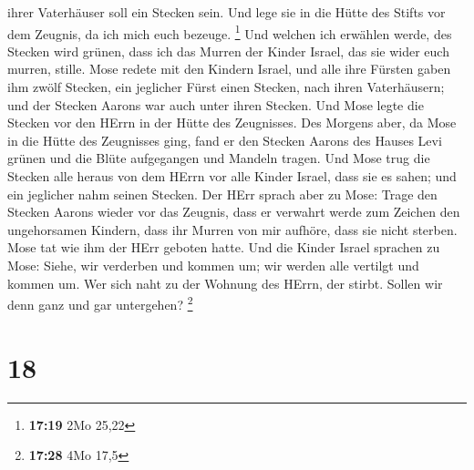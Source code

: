 ihrer Vaterhäuser soll ein Stecken sein.  Und lege sie in
die Hütte des Stifts vor dem Zeugnis, da ich mich euch bezeuge.
\footnote{\textbf{17:19} 2Mo 25,22}  Und welchen ich
erwählen werde, des Stecken wird grünen, dass ich das Murren der Kinder
Israel, das sie wider euch murren, stille.  Mose redete
mit den Kindern Israel, und alle ihre Fürsten gaben ihm zwölf Stecken,
ein jeglicher Fürst einen Stecken, nach ihren Vaterhäusern; und der
Stecken Aarons war auch unter ihren Stecken.  Und Mose
legte die Stecken vor den HErrn in der Hütte des Zeugnisses.
 Des Morgens aber, da Mose in die Hütte des Zeugnisses
ging, fand er den Stecken Aarons des Hauses Levi grünen und die Blüte
aufgegangen und Mandeln tragen.  Und Mose trug die
Stecken alle heraus von dem HErrn vor alle Kinder Israel, dass sie es
sahen; und ein jeglicher nahm seinen Stecken.  Der HErr
sprach aber zu Mose: Trage den Stecken Aarons wieder vor das Zeugnis,
dass er verwahrt werde zum Zeichen den ungehorsamen Kindern, dass ihr
Murren von mir aufhöre, dass sie nicht sterben.  Mose tat
wie ihm der HErr geboten hatte.  Und die Kinder Israel
sprachen zu Mose: Siehe, wir verderben und kommen um; wir werden alle
vertilgt und kommen um.  Wer sich naht zu der Wohnung des
HErrn, der stirbt. Sollen wir denn ganz und gar untergehen? \footnote{\textbf{17:28}
  4Mo 17,5}

\hypertarget{section-17}{%
\section{18}\label{section-17}}

